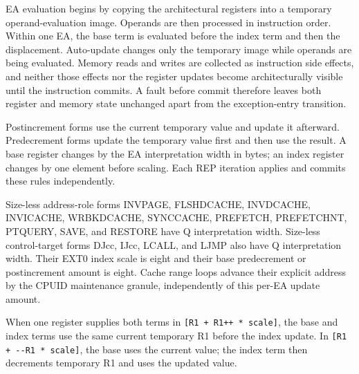 EA evaluation begins by copying the architectural registers into a temporary operand-evaluation image. Operands are
then processed in instruction order. Within one EA, the base term is evaluated before the index term and then the
displacement. Auto-update changes only the temporary image while operands are being evaluated. Memory reads and
writes are collected as instruction side effects, and neither those effects nor the register updates become
architecturally visible until the instruction commits. A fault before commit therefore leaves both register and
memory state unchanged apart from the exception-entry transition.

Postincrement forms use the current temporary value and update it afterward. Predecrement forms update the temporary
value first and then use the result. A base register changes by the EA interpretation width in bytes; an index
register changes by one element before scaling. Each REP iteration applies and commits these rules independently.

Size-less address-role forms INVPAGE, FLSHDCACHE, INVDCACHE, INVICACHE, WRBKDCACHE, SYNCCACHE, PREFETCH,
PREFETCHNT, PTQUERY, SAVE, and RESTORE have Q interpretation width. Size-less control-target forms DJcc, IJcc,
LCALL, and LJMP also have Q interpretation width. Their EXT0 index scale is eight and their base predecrement or
postincrement amount is eight. Cache range loops advance their explicit address by the CPUID maintenance granule,
independently of this per-EA update amount.

When one register supplies both terms in \texttt{[R1 + R1++ * scale]}, the base and index terms use the same
current temporary R1 before the index update. In \texttt{[R1 + {-}{-}R1 * scale]}, the base uses the current value;
the index term then decrements temporary R1 and uses the updated value.
